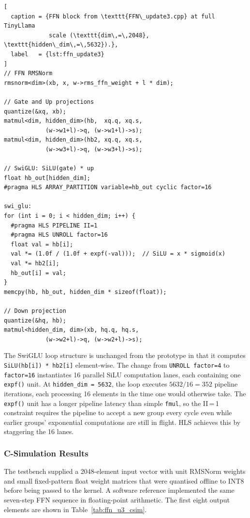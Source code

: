 \begin{lstlisting}[
  caption = {FFN block from \texttt{FFN\_update3.cpp} at full TinyLlama
             scale (\texttt{dim\,=\,2048}, \texttt{hidden\_dim\,=\,5632}).},
  label   = {lst:ffn_update3}
]
// FFN RMSNorm
rmsnorm<dim>(xb, x, w->rms_ffn_weight + l * dim);

// Gate and Up projections
quantize(&xq, xb);
matmul<dim, hidden_dim>(hb,  xq.q, xq.s,
            (w->w1+l)->q, (w->w1+l)->s);
matmul<dim, hidden_dim>(hb2, xq.q, xq.s,
            (w->w3+l)->q, (w->w3+l)->s);

// SwiGLU: SiLU(gate) * up
float hb_out[hidden_dim];
#pragma HLS ARRAY_PARTITION variable=hb_out cyclic factor=16

swi_glu:
for (int i = 0; i < hidden_dim; i++) {
  #pragma HLS PIPELINE II=1
  #pragma HLS UNROLL factor=16
  float val = hb[i];
  val *= (1.0f / (1.0f + expf(-val)));  // SiLU = x * sigmoid(x)
  val *= hb2[i];
  hb_out[i] = val;
}
memcpy(hb, hb_out, hidden_dim * sizeof(float));

// Down projection
quantize(&hq, hb);
matmul<hidden_dim, dim>(xb, hq.q, hq.s,
            (w->w2+l)->q, (w->w2+l)->s);
\end{lstlisting}

The SwiGLU loop structure is unchanged from the prototype in that it
computes \texttt{SiLU(hb[i]) * hb2[i]} element-wise. The change from
\texttt{UNROLL factor=4} to \texttt{factor=16} instantiates 16 parallel
SiLU computation lanes, each containing one \texttt{expf()} unit. At
\texttt{hidden\_dim\,=\,5632}, the loop executes $5632/16 = 352$ pipeline
iterations, each processing 16 elements in the time one would otherwise
take. The \texttt{expf()} unit has a longer pipeline latency than simple
\texttt{fmul}, so the II\,=\,1 constraint requires the pipeline to accept
a new group every cycle even while earlier groups' exponential computations
are still in flight. HLS achieves this by staggering the 16 lanes.

\subsubsection{C-Simulation Results}
\label{subsubsec:ffn_update3_csim}

The testbench supplied a 2048-element input vector with unit RMSNorm weights
and small fixed-pattern float weight matrices that were quantised offline to
INT8 before being passed to the kernel. A software reference implemented the
same seven-step FFN sequence in floating-point arithmetic. The first eight
output elements are shown in Table~\ref{tab:ffn_u3_csim}.

